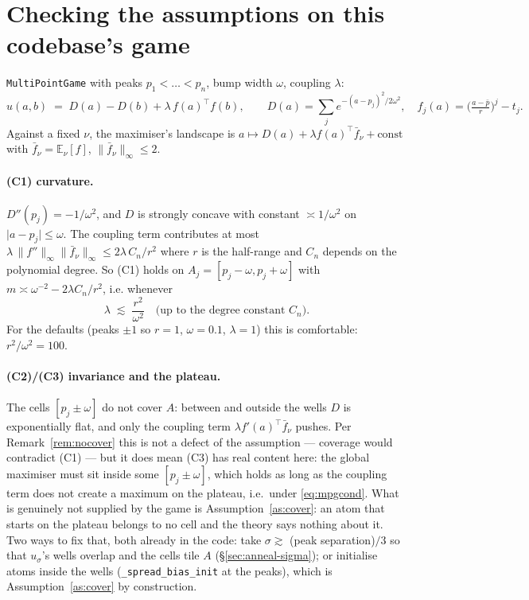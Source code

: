 \documentclass[11pt,a4paper]{article}
\theoremstyle{plain}
\theoremstyle{definition}
\theoremstyle{remark}
\newcommand{\E}{\mathbb{E}}
\newcommand{\norm}[1]{\lVert #1 \rVert}
\begin{document}
\section{Checking the assumptions on this codebase's game}

\texttt{MultiPointGame} with peaks $p_1<\dots<p_n$, bump width $\omega$, coupling
$\lambda$:
\[
u(a,b) \;=\; D(a)-D(b)+\lambda\,f(a)^\top f(b),\qquad
D(a)=\sum_{j}e^{-(a-p_j)^2/2\omega^2},\quad f_j(a)=\Big(\tfrac{a-\bar p}{r}\Big)^{j}-t_j .
\]
Against a fixed $\nu$, the maximiser's landscape is
$a\mapsto D(a)+\lambda f(a)^\top\bar f_\nu + \text{const}$ with
$\bar f_\nu=\E_\nu[f]$, $\norm{\bar f_\nu}_\infty\le2$.

\paragraph{(C1) curvature.} $D''(p_j)=-1/\omega^2$, and $D$ is strongly concave with
constant $\asymp1/\omega^2$ on $\lvert a-p_j\rvert\le\omega$. The coupling term
contributes at most $\lambda\,\norm{f''}_\infty\norm{\bar f_\nu}_\infty
\le 2\lambda\,C_n/r^2$ where $r$ is the half-range and $C_n$ depends on the polynomial
degree. So (C1) holds on $A_j=[p_j-\omega,p_j+\omega]$ with
$m \asymp \omega^{-2}-2\lambda C_n/r^2$, i.e. whenever
\begin{equation}\label{eq:mpgcond}
\lambda \;\lesssim\; \frac{r^2}{\omega^2}\quad\text{(up to the degree constant }C_n).
\end{equation}
For the defaults (peaks $\pm1$ so $r=1$, $\omega=0.1$, $\lambda=1$) this is
comfortable: $r^2/\omega^2=100$.

\paragraph{(C2)/(C3) invariance and the plateau.} The cells $[p_j\pm\omega]$ do not
cover $A$: between and outside the wells $D$ is exponentially flat, and only the
coupling term $\lambda f'(a)^\top\bar f_\nu$ pushes. Per Remark~\ref{rem:nocover} this
is not a defect of the assumption --- coverage would contradict (C1) --- but it does
mean (C3) has real content here: the global maximiser must sit inside some
$[p_j\pm\omega]$, which holds as long as the coupling term does not create a maximum on
the plateau, i.e.\ under \eqref{eq:mpgcond}. What is genuinely not supplied by the game
is Assumption~\ref{as:cover}: an atom that starts on the plateau belongs to no cell and
the theory says nothing about it. Two ways to fix that, both already in the code: take
$\sigma\gtrsim$ (peak separation)$/3$ so that $u_\sigma$'s wells overlap and the
cells tile $A$ (\S\ref{sec:anneal-sigma}); or initialise atoms inside the wells
(\texttt{\_spread\_bias\_init} at the peaks), which is Assumption~\ref{as:cover}
by construction.
\end{document}

